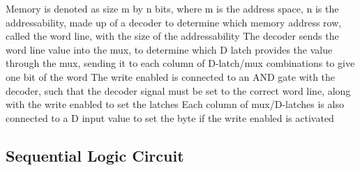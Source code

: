 \documentclass[11 pt, twoside]{article}
\newenvironment{outline*}
{
	\begin{outline}[enumerate]
	}
	{\end{outline}
}
\begin{document}
\begin{outline*}
\1 Memory is denoted as size m by n bits, where m is the address space, n is the addressability, made up of a decoder to determine which memory address row, called the word line, with the size of the addressability
\2 The decoder sends the word line value into the mux, to determine which D latch provides the value through the mux, sending it to each column of D-latch/mux combinations to give one bit of the word
\2 The write enabled is connected to an AND gate with the decoder, such that the decoder signal must be set to the correct word line, along with the write enabled to set the latches
\2 Each column of mux/D-latches is also connected to a D input value to set the byte if the write enabled is activated
\end{outline*}
\subsection{Sequential Logic Circuit}
\end{document}
